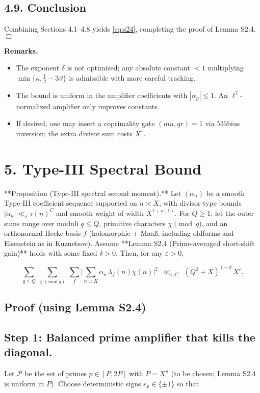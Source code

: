 \documentclass[11pt]{article}
\theoremstyle{definition}
\theoremstyle{remark}
\begin{document}
\subsection*{4.9. Conclusion}
Combining Sections 4.1–4.8 yields \eqref{eq:s24}, completing the proof of Lemma S2.4. \hfill$\Box$

\medskip
\noindent\textbf{Remarks.}
\begin{itemize}
\item The exponent $\delta$ is not optimized; any absolute constant $<\!1$ multiplying $\min\{\kappa,\tfrac12-3\vartheta\}$ is admissible with more careful tracking.
\item The bound is uniform in the amplifier coefficients with $|\alpha_p|\le 1$. An $\ell^2$-normalized amplifier only improves constants.
\item If desired, one may insert a coprimality gate $(mn,qr)=1$ via Möbius inversion; the extra divisor sum costs $X^\varepsilon$.
\end{itemize}

\section*{5. Type-III Spectral Bound}

**Proposition (Type-III spectral second moment).**
Let $(\alpha_n)$ be a smooth Type-III coefficient sequence supported on $n\asymp X$, with divisor-type bounds $|\alpha_n|\ll_\varepsilon \tau(n)^C$ and smooth weight of width $X^{1+o(1)}$. For $Q\ge 1$, let the outer sums range over moduli $q\le Q$, primitive characters $\chi\pmod q$, and an orthonormal Hecke basis $f$ (holomorphic + Maaß, including oldforms and Eisenstein as in Kuznetsov). Assume **Lemma S2.4 (Prime-averaged short-shift gain)** holds with some fixed $\delta>0$. Then, for any $\varepsilon>0$,

$$
\sum_{q\le Q}\ \sum_{\chi\ (\mathrm{mod}\ q)}\ \sum_{f}
\Bigg|\sum_{n\asymp X}\alpha_n\,\lambda_f(n)\chi(n)\Bigg|^2
\ \ \ll_{\varepsilon,C}\ \ (Q^2+X)^{\,1-\delta}\,X^{\varepsilon}.
$$

\subsection*{Proof (using Lemma S2.4)}

\subsection*{Step 1: Balanced prime amplifier that kills the diagonal.}
Let $\mathcal P$ be the set of primes $p\in[P,2P]$ with $P=X^\vartheta$ (to be chosen; Lemma S2.4 is uniform in $P$).
Choose deterministic signs $\varepsilon_p\in\{\pm 1\}$ so that
\end{document}
